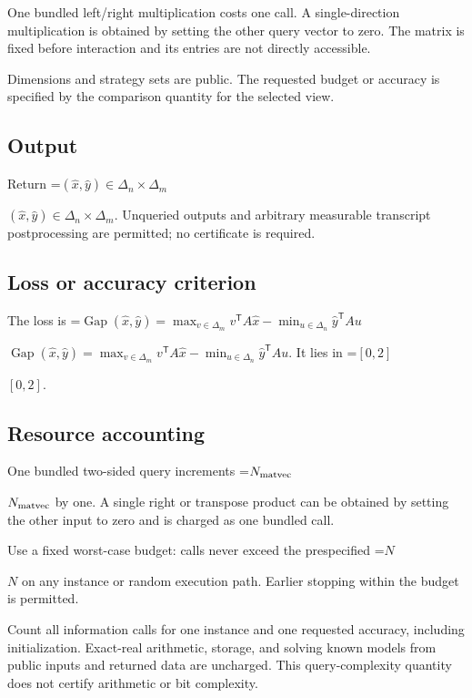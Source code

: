 \documentclass[10pt,a4paper]{article}
\newcommand{\AtlasMath}[1]{\par\begingroup\centering\setbox0=\hbox{$\displaystyle #1$}\ifdim\wd0>1.4\linewidth\typeout{ATLAS WIDE FORMULA: \the\wd0}\fi\ifdim\wd0>\linewidth\resizebox{\linewidth}{!}{\box0}\else\box0\fi\par\endgroup}
\newcommand{\AtlasInlineMath}[1]{\begingroup\setbox0=\hbox{$#1$}\ifdim\wd0>.4\linewidth\endgroup\AtlasMath{#1}\else\endgroup$#1$\fi}
\begin{document}
One bundled left/right multiplication costs one call. A single-direction multiplication is obtained by setting the other query vector to zero. The matrix is fixed before interaction and its entries are not directly accessible.



Dimensions and strategy sets are public. The requested budget or accuracy is specified by the comparison quantity for the selected view.



\subsection{Output}


Return \AtlasInlineMath{(\widehat x,\widehat y)\in\Delta_n\times\Delta_m}. Unqueried outputs and arbitrary measurable transcript postprocessing are permitted; no certificate is required.



\subsection{Loss or accuracy criterion}


The loss is \AtlasInlineMath{\operatorname{Gap}(\widehat x,\widehat y)=\max_{v\in\Delta_m}v^{\mathsf T}A\widehat x-\min_{u\in\Delta_n}\widehat y^{\mathsf T}Au}. It lies in \AtlasInlineMath{[0,2]}.



\subsection{Resource accounting}


One bundled two-sided query increments \AtlasInlineMath{N_{\rm matvec}} by one. A single right or transpose product can be obtained by setting the other input to zero and is charged as one bundled call.



Use a fixed worst-case budget: calls never exceed the prespecified \AtlasInlineMath{N} on any instance or random execution path. Earlier stopping within the budget is permitted.



Count all information calls for one instance and one requested accuracy, including initialization. Exact-real arithmetic, storage, and solving known models from public inputs and returned data are uncharged. This query-complexity quantity does not certify arithmetic or bit complexity.
\end{document}
